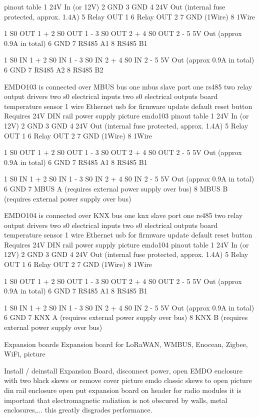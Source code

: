 \documentclass[11pt,fleqn]{book} %
\numberwithin{equation}{section} %
\numberwithin{figure}{section} %
\numberwithin{table}{section} %
\begin{document}
pinout table
1 24V In (or 12V)
2 GND
3 GND
4 24V Out (internal fuse protected, approx. 1.4A)
5 Relay OUT 1
6 Relay OUT 2
7 GND (1Wire)
8 1Wire

1 S0 OUT 1 +
2 S0 OUT 1 -
3 S0 OUT 2 +
4 S0 OUT 2 -
5 5V Out (approx 0.9A in total)
6 GND
7 RS485 A1
8 RS485 B1

1 S0 IN 1 +
2 S0 IN 1 -
3 S0 IN 2 +
4 S0 IN 2 -
5 5V Out (approx 0.9A in total)
6 GND
7 RS485 A2
8 RS485 B2



EMDO103 is connected over MBUS bus
one mbus slave port
one rs485
two relay output drivers
two s0 electrical inputs
two s0 electrical outputs
board temperature sensor
1 wire
Ethernet 
usb for firmware update
default reset button
Requires 24V DIN rail power supply
picture emdo103
pinout table
1 24V In (or 12V)
2 GND
3 GND
4 24V Out (internal fuse protected, approx. 1.4A)
5 Relay OUT 1
6 Relay OUT 2
7 GND (1Wire)
8 1Wire

1 S0 OUT 1 +
2 S0 OUT 1 -
3 S0 OUT 2 +
4 S0 OUT 2 -
5 5V Out (approx 0.9A in total)
6 GND
7 RS485 A1
8 RS485 B1

1 S0 IN 1 +
2 S0 IN 1 -
3 S0 IN 2 +
4 S0 IN 2 -
5 5V Out (approx 0.9A in total)
6 GND
7 MBUS A (requires external power supply over bus)
8 MBUS B (requires external power supply over bus)



EMDO104 is connected over KNX bus
one knx slave port
one rs485
two relay output drivers
two s0 electrical inputs
two s0 electrical outputs
board temperature sensor
1 wire
Ethernet 
usb for firmware update
default reset button
Requires 24V DIN rail power supply
picture emdo104
pinout table
1 24V In (or 12V)
2 GND
3 GND
4 24V Out (internal fuse protected, approx. 1.4A)
5 Relay OUT 1
6 Relay OUT 2
7 GND (1Wire)
8 1Wire

1 S0 OUT 1 +
2 S0 OUT 1 -
3 S0 OUT 2 +
4 S0 OUT 2 -
5 5V Out (approx 0.9A in total)
6 GND
7 RS485 A1
8 RS485 B1

1 S0 IN 1 +
2 S0 IN 1 -
3 S0 IN 2 +
4 S0 IN 2 -
5 5V Out (approx 0.9A in total)
6 GND
7 KNX A (requires external power supply over bus)
8 KNX B (requires external power supply over bus)



Expansion boards
Expansion board for LoRaWAN, WMBUS, Enocean, Zigbee, WiFi, picture

Install / deinstall Expansion Board, disconnect power, open EMDO enclosure with two black skews or remove cover
picture emdo classic skews to open
picture din rail enclosure open
put expansion board on header
for radio modules it is important that electromagnetic radiation is not obscured by walls, metal enclosures,... this greatly disgrades performance.
\end{document}
